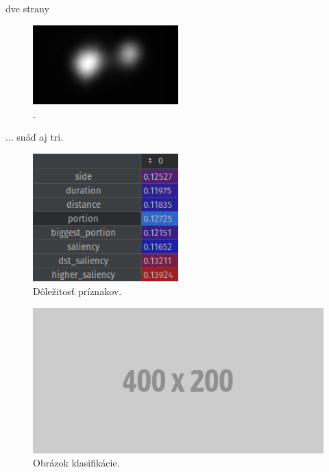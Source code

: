 \newpage

dve strany

\begin{figure}[ht]
    \centering
    \includegraphics[width=0.5\textwidth]{images/05/frame.png}
    \caption{.}
    \label{img:Saliency map.}
\end{figure}

\newpage

... snáď aj tri.

\begin{figure}[ht]
    \centering
    \includegraphics[width=0.5\textwidth]{images/05/importance.png}
    \caption{Dôležitosť príznakov.}
    \label{img:road}
\end{figure}

\begin{figure}[ht]
    \centering
    \includegraphics[width=1\textwidth]{images/placeholder.png}
    \caption{Obrázok klasifikácie.}
    \label{img:road}
\end{figure}

